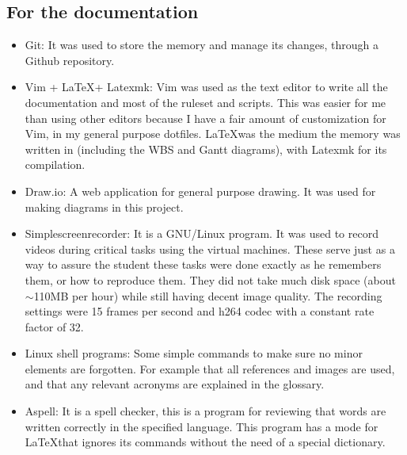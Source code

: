 \subsection{For the documentation}
\begin{itemize}
	\item Git: It was used to store the memory and manage its changes, through a Github repository\cite{memoria_github}.
	\item Vim + \LaTeX + Latexmk: Vim was used as the text editor to write all the documentation and most of the ruleset and scripts. This was easier for me than using other editors because I have a fair amount of customization for Vim, in my general purpose dotfiles\cite{andresgomezvidal_gitlab}. \LaTeX was the medium the memory was written in (including the WBS and Gantt diagrams), with Latexmk for its compilation.
	\item Draw.io: A web application for general purpose drawing\cite{drawio}. It was used for making diagrams in this project.
	\item Simplescreenrecorder: It is a GNU/Linux program. It was used to record videos during critical tasks using the virtual machines. These serve just as a way to assure the student these tasks were done exactly as he remembers them, or how to reproduce them.
	They did not take much disk space (about $\sim$110MB per hour) while still having decent image quality. The recording settings were 15 frames per second and h264 codec with a constant rate factor of 32.
	\item Linux shell programs: Some simple commands to make sure no minor elements are forgotten. For example that all references and images are used, and that any relevant acronyms are explained in the glossary.
	\item Aspell: It is a spell checker\cite{aspell}, this is a program for reviewing that words are written correctly in the specified language. This program has a mode for \LaTeX that ignores its commands without the need of a special dictionary.
\end{itemize}

